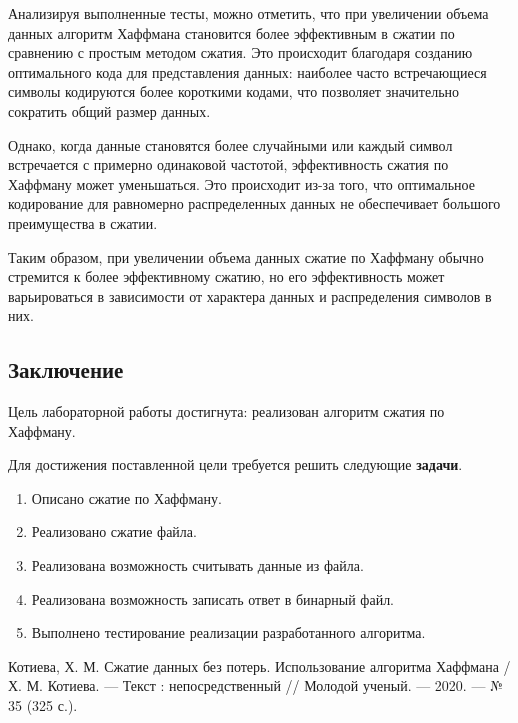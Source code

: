 \documentclass[12pt, a4paper]{article}
\begin{document}
Анализируя выполненные тесты, можно отметить, что при увеличении объема данных алгоритм Хаффмана становится более эффективным в сжатии по сравнению с простым методом сжатия. Это происходит благодаря созданию оптимального кода для представления данных: наиболее часто встречающиеся символы кодируются более короткими кодами, что позволяет значительно сократить общий размер данных.

Однако, когда данные становятся более случайными или каждый символ встречается с примерно одинаковой частотой, эффективность сжатия по Хаффману может уменьшаться. Это происходит из-за того, что оптимальное кодирование для равномерно распределенных данных не обеспечивает большого преимущества в сжатии.

Таким образом, при увеличении объема данных сжатие по Хаффману обычно стремится к более эффективному сжатию, но его эффективность может варьироваться в зависимости от характера данных и распределения символов в них.

\newpage
\begin{center}
    \section*{Заключение}
\end{center}

Цель лабораторной работы достигнута: реализован алгоритм сжатия по Хаффману.

Для достижения поставленной цели требуется решить следующие \textbf{задачи}.
\begin{enumerate}
\item Описано сжатие по Хаффману.
\item Реализовано сжатие файла.
\item Реализована возможность считывать данные из файла.
\item Реализована возможность записать ответ в бинарный файл.
\item Выполнено тестирование реализации разработанного алгоритма.
\end{enumerate}

\newpage
\begin{center}
\begin{thebibliography}{}
 Котиева, Х. М. Сжатие данных без потерь. Использование алгоритма Хаффмана / Х. М. Котиева. — Текст : непосредственный // Молодой ученый. — 2020. — № 35 (325 с.).
\end{thebibliography}
\end{center}
\end{document}
